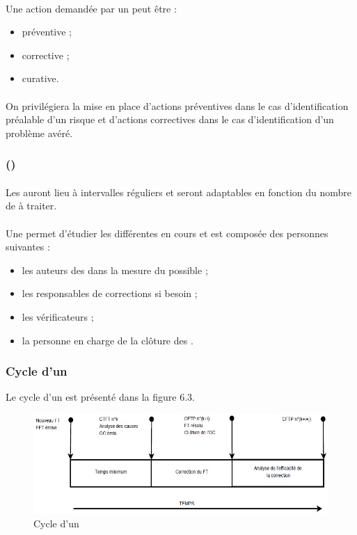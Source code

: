 \paragraph*{} Une action demandée par un \OCCourt{} peut être :
\begin{itemize}
\item préventive ;
\item corrective ;
\item curative.
\end{itemize}

\paragraph*{} On privilégiera la mise en place d'actions préventives dans le cas d'identification préalable
d'un risque et d'actions correctives dans le cas d'identification d'un problème avéré.


\subsubsection*{\CTFT (\CTFTCourt)}
\paragraph*{} Les \CTFTCourt{} auront lieu à intervalles réguliers et seront adaptables en fonction du nombre de \FTCourt{} à
traiter.

\paragraph*{} Une \CTFTCourt{} permet d'étudier les différentes \FTCourt{} en cours et est composée des personnes
suivantes :
\begin{itemize}
\item les auteurs des \FFTCourt{} dans la mesure du possible ;
\item les responsables de corrections si besoin ;
\item les vérificateurs ;
\item la personne en charge de la clôture des \OCCourt .
\end{itemize}

\subsubsection*{Cycle d'un \FTCourt}
Le cycle d'un \FTCourt{} est présenté dans la figure 6.3.

\begin{figure}[h]
   \center
   \caption{\label{Figure 6.1} Cycle d'un \FT}
   \includegraphics[width=13cm]{./images/cycle_Dun_FT.jpg}
\end{figure}

